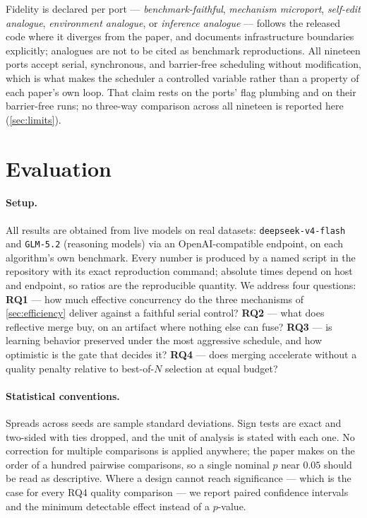 \documentclass{article}
\newcommand{\code}[1]{\texttt{#1}}
\begin{document}
Fidelity is declared per port --- \emph{benchmark-faithful}, \emph{mechanism microport}, \emph{self-edit analogue}, \emph{environment analogue}, or \emph{inference analogue} --- follows the released code where it diverges from the paper, and documents infrastructure boundaries explicitly; analogues are not to be cited as benchmark reproductions. All nineteen ports accept serial, synchronous, and barrier-free scheduling without modification, which is what makes the scheduler a controlled variable rather than a property of each paper's own loop. That claim rests on the ports' flag plumbing and on their barrier-free runs; no three-way comparison across all nineteen is reported here (\cref{sec:limits}).

\section{Evaluation}
\label{sec:experiments}

\paragraph{Setup.} All results are obtained from live models on real datasets: \code{deepseek-v4-flash} and \code{GLM-5.2} (reasoning models) via an OpenAI-compatible endpoint, on each algorithm's own benchmark. Every number is produced by a named script in the repository with its exact reproduction command; absolute times depend on host and endpoint, so ratios are the reproducible quantity. We address four questions: \textbf{RQ1} --- how much effective concurrency do the three mechanisms of \cref{sec:efficiency} deliver against a faithful serial control? \textbf{RQ2} --- what does reflective merge buy, on an artifact where nothing else can fuse? \textbf{RQ3} --- is learning behavior preserved under the most aggressive schedule, and how optimistic is the gate that decides it? \textbf{RQ4} --- does merging accelerate without a quality penalty relative to best-of-$N$ selection at equal budget?

\paragraph{Statistical conventions.} Spreads across seeds are sample standard deviations. Sign tests are exact and two-sided with ties dropped, and the unit of analysis is stated with each one. No correction for multiple comparisons is applied anywhere; the paper makes on the order of a hundred pairwise comparisons, so a single nominal $p$ near $0.05$ should be read as descriptive. Where a design cannot reach significance --- which is the case for every RQ4 quality comparison --- we report paired confidence intervals and the minimum detectable effect instead of a $p$-value.
\end{document}
